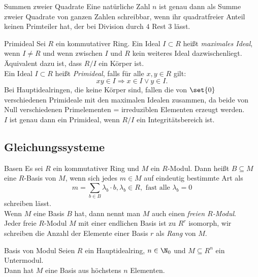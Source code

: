 \begin{karte}{Summen zweier Quadrate}
    Eine natürliche Zahl \(n\) ist genau dann als Summe zweier Quadrate 
    von ganzen Zahlen schreibbar, wenn ihr quadratfreier Anteil keinen 
    Primteiler hat, der bei Division durch \(4\) Rest \(3\) lässt.
\end{karte}

\begin{karte}{Primideal}
    Sei \(R\) ein kommutativer Ring. Ein Ideal \(I \subset R\) 
    heißt \textit{maximales Ideal}, wenn \(I \neq R\) und wenn 
    zwischen \(I\) und \(R\) kein weiteres Ideal dazwischenliegt. \\
    Äquivalent dazu ist, dass \(R/I\) ein Körper ist.\\
    Ein Ideal \( I \subset R \) heißt \textit{Primideal}, falls für 
    alle \(x,y\in R\) gilt: 
    \[ xy \in I \Rightarrow x\in I \vee y \in I. \]
    Bei Hauptidealringen, die keine Körper sind, fallen die von \(\set{0}\) 
    verschiedenen Primideale mit den maximalen Idealen zusammen, da beide von 
    Null verschiedenen Primelementen = irreduziblen Elementen erzeugt werden.\\
    \(I\) ist genau dann ein Primideal, wenn \(R/I\) ein Integritätsbereich ist.
\end{karte}

\subsection{Gleichungssysteme}

\begin{karte}{Basen}
    Es sei \(R\) ein kommutativer Ring und \(M\) ein \(R\)-Modul. 
    Dann heißt \(B\subseteq M\) eine \(R\)-Basis von \(M\), 
    wenn sich jedes \(m\in M\) auf eindeutig bestimmte Art als 
    \[ m = \sum_{b\in B} \lambda_b \cdot b, \lambda_b \in R, \text{ fast alle } \lambda_b = 0 \]
    schreiben lässt.\\
    Wenn \(M\) eine Basis \(B\) hat, dann nennt man \(M\) auch einen \textit{freien \(R\)-Modul}.\\
    Jeder freie \(R\)-Modul \(M\) mit einer endlichen Basis ist zu \(R^r\) 
    isomorph, wir schreiben die Anzahl der Elemente einer Basis \(r\)
    als \textit{Rang} von \(M\).
\end{karte}

\begin{karte}{Basis von Modul}
    Seien \(R\) ein Hauptidealring, \(n\in \N_0\) und 
    \(M\subseteq R^n\) ein Untermodul. \\
    Dann hat \(M\) eine Basis aus höchstens \(n\) Elementen. 
\end{karte}

